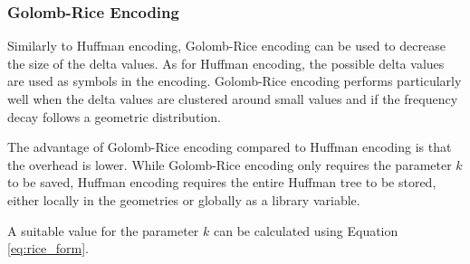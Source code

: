 \subsubsection{Golomb-Rice Encoding}
Similarly to Huffman encoding, Golomb-Rice encoding can be used to decrease the size of the delta values. As for Huffman encoding, the possible delta values are used as symbols in the encoding. Golomb-Rice encoding performs particularly well when the delta values are clustered around small values and if the frequency decay follows a geometric distribution.

The advantage of Golomb-Rice encoding compared to Huffman encoding is that the overhead is lower. While Golomb-Rice encoding only requires the parameter $k$ to be saved, Huffman encoding requires the entire Huffman tree to be stored, either locally in the geometries or globally as a library variable. 

A suitable value for the parameter $k$ can be calculated using Equation \ref{eq:rice_form}. 


